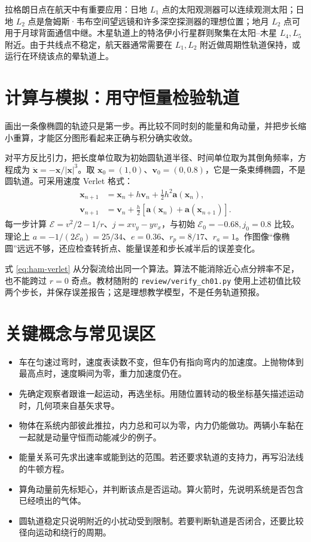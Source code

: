\begin{modernbox}
拉格朗日点在航天中有重要应用：日地 $L_1$ 点的太阳观测器可以连续观测太阳；日地 $L_2$ 点是詹姆斯·韦布空间望远镜和许多深空探测器的理想位置；地月 $L_2$ 点可用于月球背面通信中继。木星轨道上的特洛伊小行星群则聚集在太阳--木星 $L_4,L_5$ 附近。由于共线点不稳定，航天器通常需要在 $L_1,L_2$ 附近做周期性轨道保持，或运行在环绕该点的晕轨道上。
\end{modernbox}

\section{计算与模拟：用守恒量检验轨道}\label{sec:orbit-compute}
画出一条像椭圆的轨迹只是第一步。再比较不同时刻的能量和角动量，并把步长缩小重算，才能区分图形看起来正确与积分确实收敛。

对平方反比引力，把长度单位取为初始圆轨道半径、时间单位取为其倒角频率，方程成为 $\ddot{\boldsymbol x}=-\boldsymbol x/|\boldsymbol x|^3$。取 $\boldsymbol x_0=(1,0)$、$\boldsymbol v_0=(0,0.8)$，它是一条束缚椭圆，不是圆轨道。可采用速度 Verlet 格式：
\begin{align}
\boldsymbol x_{n+1}&=\boldsymbol x_n+h\boldsymbol v_n+\tfrac12h^2\boldsymbol a(\boldsymbol x_n),\\
\boldsymbol v_{n+1}&=\boldsymbol v_n+\tfrac h2[\boldsymbol a(\boldsymbol x_n)+\boldsymbol a(\boldsymbol x_{n+1})].
\end{align}
每一步计算 $\mathcal E=v^2/2-1/r$、$j=xv_y-yv_x$，与初始 $\mathcal E_0=-0.68,j_0=0.8$ 比较。理论上 $a=-1/(2\mathcal E_0)=25/34$、$e=0.36$、$r_p=8/17$、$r_a=1$。作图像“像椭圆”远远不够，还应检查转折点、能量误差和步长减半后的误差变化。

式 \eqref{eq:ham-verlet} 从分裂流给出同一个算法。算法不能消除近心点分辨率不足，也不能跨过 $r=0$ 奇点。教材随附的 \texttt{review/verify\_ch01.py} 使用上述初值比较两个步长，并保存误差报告；这是理想教学模型，不是任务轨道预报。

\section*{关键概念与常见误区}
\begin{itemize}[leftmargin=1.8em]
\item 车在匀速过弯时，速度表读数不变，但车仍有指向弯内的加速度。上抛物体到最高点时，速度瞬间为零，重力加速度仍在。
\item 先确定观察者跟谁一起运动，再选坐标。用随位置转动的极坐标基矢描述运动时，几何项来自基矢求导。
\item 物体在系统内部彼此推拉，内力总和可以为零，内力仍能做功。两辆小车黏在一起就是动量守恒而动能减少的例子。
\item 能量关系可先求出速率或能到达的范围。若还要求轨道的支持力，再写沿法线的牛顿方程。
\item 算角动量前先标矩心，并判断该点是否运动。算火箭时，先说明系统是否包含已经喷出的气体。
\item 圆轨道稳定只说明附近的小扰动受到限制。若要判断轨道是否闭合，还要比较径向运动和绕行的周期。
\end{itemize}

